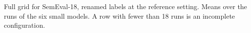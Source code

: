 \begin{table}[t]
  \centering
  \footnotesize
  
  \caption{Full grid for SemEval-18, renamed labels at the reference setting. Means over the runs of the six small models. A row with fewer than 18 runs is an incomplete configuration.}
  \label{tab:grid_semeval_relabel}
\end{table}

